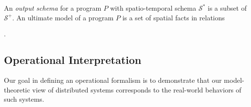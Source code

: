 




An {\em output schema} for a \lang program $P$ with spatio-temporal schema $\mathcal{S}^*$ is a subset of $\mathcal{S}^+$.  An ultimate model of a \lang program $P$ is a set of spatial facts in relations 

.

\subsection{Operational Interpretation}
\label{sec:operational}

Our goal in defining an operational formalism is to demonstrate that our model-theoretic view of distributed systems corresponds to the real-world behaviors of such systems.

